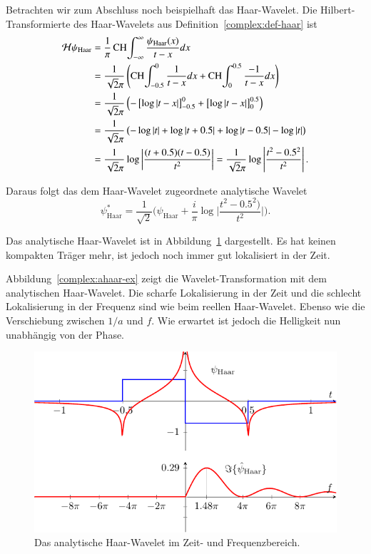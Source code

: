 Betrachten wir zum Abschluss noch beispielhaft das Haar-Wavelet.
Die Hilbert-Transformierte des Haar-Wavelets aus Definition~\ref{complex:def-haar} ist
\begin{align*}
	\Hilb \psi_{\text{Haar}}
	&= \frac{1}{\pi} \CH\int_{-\infty}^{\infty} \frac{\psi_{\text{Haar}}(x)}{t-x} dx\\
	&= \frac{1}{\sqrt2\pi}\left( \CH\int_{-0.5}^{0} \frac{1}{t-x}dx + \CH\int_{0}^{0.5} \frac{-1}{t-x}dx \right)\\
	&= \frac{1}{\sqrt2\pi} \left( -\left[\log \left|t-x\right| \right]_{-0.5}^{0} + \left[\log\left|t-x\right| \right]_{0}^{0.5} \right)\\
	&= \frac{1}{\sqrt2\pi} \left( -\log\left|t\right| + \log\left|t+0.5\right| + \log\left|t-0.5\right| - \log\left|t\right|\right)\\
	&= \frac{1}{\sqrt2\pi} \log\left|\frac{(t+0.5)(t-0.5)}{t^2}\right|
= \frac{1}{\sqrt2\pi} \log\left|\frac{t^2-0.5^2}{t^2}\right|.
\end{align*}

Daraus folgt das dem Haar-Wavelet zugeordnete analytische Wavelet
\[\psi^\ast_{\text{Haar}} = 
\frac{1}{\sqrt{2}}\biggl(\psi_{\text{Haar}} 
+ 
\frac{i}{\pi} \log\biggl|\frac{t^2-0.5^2)}{t^2}\biggr|\biggr).\]

Das analytische Haar-Wavelet ist in Abbildung~\ref{complex:ahaar} dargestellt.
Es hat keinen kompakten Träger mehr, ist jedoch noch immer gut lokalisiert in der Zeit.

Abbildung~\ref{complex:ahaar-ex} zeigt die Wavelet-Transformation mit dem analytischen Haar-Wavelet.
Die scharfe Lokalisierung in der Zeit und die schlecht Lokalisierung in der Frequenz sind wie beim reellen Haar-Wavelet. Ebenso wie die Verschiebung zwischen $1/a$ und $f$.
Wie erwartet ist jedoch die Helligkeit nun unabhängig von der Phase.

\begin{figure}
	\centering
	\includegraphics{papers/complex/images/ahaar.pdf}
	\caption{Das analytische Haar-Wavelet im Zeit- und Frequenzbereich.}
	\label{complex:ahaar}
\end{figure}

